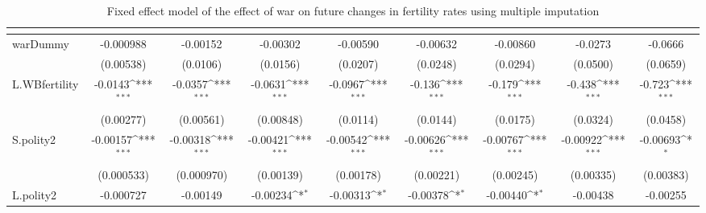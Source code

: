 \begin{table}[htbp]\centering
\def\sym#1{\ifmmode^{#1}\else\(^{#1}\)\fi}
\caption{Fixed effect model of the effect of war on future changes in fertility rates using multiple imputation\label{imputfertility}}
\begin{tabular}{l*{8}{c}}
\hline\hline
                    &&&&&&&&\\
\hline
warDummy            &   -0.000988         &    -0.00152         &    -0.00302         &    -0.00590         &    -0.00632         &    -0.00860         &     -0.0273         &     -0.0666         \\
                    &   (0.00538)         &    (0.0106)         &    (0.0156)         &    (0.0207)         &    (0.0248)         &    (0.0294)         &    (0.0500)         &    (0.0659)         \\
[1em]
L.WBfertility       &     -0.0143\sym{***}&     -0.0357\sym{***}&     -0.0631\sym{***}&     -0.0967\sym{***}&      -0.136\sym{***}&      -0.179\sym{***}&      -0.438\sym{***}&      -0.723\sym{***}\\
                    &   (0.00277)         &   (0.00561)         &   (0.00848)         &    (0.0114)         &    (0.0144)         &    (0.0175)         &    (0.0324)         &    (0.0458)         \\
[1em]
S.polity2           &    -0.00157\sym{***}&    -0.00318\sym{***}&    -0.00421\sym{***}&    -0.00542\sym{***}&    -0.00626\sym{***}&    -0.00767\sym{***}&    -0.00922\sym{***}&    -0.00693\sym{*}  \\
                    &  (0.000533)         &  (0.000970)         &   (0.00139)         &   (0.00178)         &   (0.00221)         &   (0.00245)         &   (0.00335)         &   (0.00383)         \\
[1em]
L.polity2           &   -0.000727         &    -0.00149         &    -0.00234\sym{*}  &    -0.00313\sym{*}  &    -0.00378\sym{*}  &    -0.00440\sym{*}  &    -0.00438         &    -0.00255         \\

\end{tabular}
\end{table}
